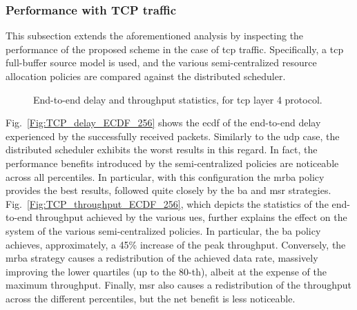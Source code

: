\subsubsection{Performance with TCP traffic}

This subsection extends the aforementioned analysis by inspecting the performance of the proposed scheme in the case of \gls{tcp} traffic. Specifically, a \gls{tcp} full-buffer source model is used, and the various semi-centralized resource allocation policies are compared against the distributed scheduler.

\begin{figure}[t!]
\centering
  \hfill
   \caption{End-to-end delay and throughput statistics, for \gls{tcp} layer 4 protocol.}
  \label{Fig:TCP_ECDFs}
    \vspace{-.3cm} 
\end{figure}

Fig.~\ref{Fig:TCP_delay_ECDF_256} shows the \gls{ecdf} of the end-to-end delay experienced by the successfully received packets. Similarly to the \gls{udp} case, the distributed scheduler exhibits the worst results in this regard. In fact, the performance benefits introduced by the semi-centralized policies are noticeable across all percentiles. In particular, with this configuration the \gls{mrba} policy provides the best results, followed quite closely by the \gls{ba} and \gls{msr} strategies. Fig.~\ref{Fig:TCP_throughput_ECDF_256}, which depicts the statistics of the end-to-end throughput achieved by the various \glspl{ue}, further explains the effect on the system of the various semi-centralized policies. In particular, the \gls{ba} policy achieves, approximately, a 45\% increase of the peak throughput. Conversely, the \gls{mrba} strategy causes a redistribution of the achieved data rate, massively improving the lower quartiles (up to the 80-th), albeit at the expense of the maximum throughput. Finally, \gls{msr} also causes a redistribution of the throughput across the different percentiles, but the net benefit is less noticeable.

